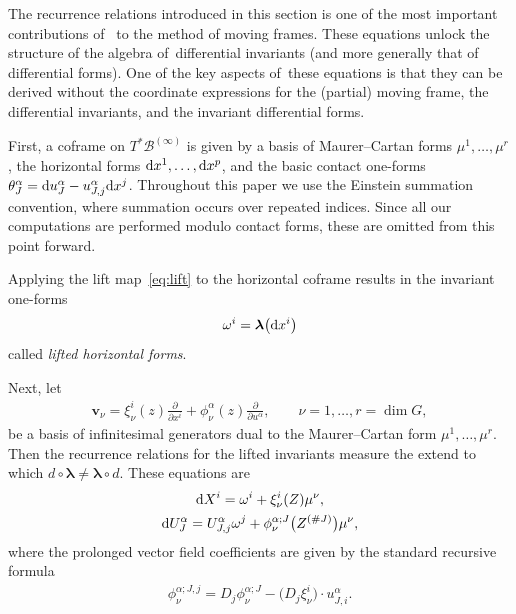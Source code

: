 \documentclass[pdftex]{sigma}%
\numberwithin{equation}{section}
\newcommand{\B}{\mathcal{B}}
\newcommand{\bl}{\boldsymbol{\lambda}}
\newcommand{\pp}[2]{\frac{\partial #1}{\partial #2}}
\newcommand{\vv}{\mathbf{v}}
\begin{document}
The recurrence relations introduced in this section is one of the most important contributions of~\cite{FO-1999} to the method of moving frames. These equations unlock the structure of the algebra of~differential invariants (and more generally that of differential forms). One of the key aspects of~these equations is that they can be derived without the coordinate expressions for the (partial) moving frame, the differential invariants, and the invariant differential forms.

First, a coframe on $T^*\B^{(\infty)}$ is given by a basis of Maurer--Cartan forms $\mu^1,\dots,\mu^r$, the horizontal forms ${\rm d}x^1,\dots,{\rm d}x^p$, and the basic contact one-forms $\theta^\alpha_J = {\rm d}u^\alpha_J - u^\alpha_{J,j}{\rm d}x^j$. Throughout this paper we use the Einstein summation convention, where summation
occurs over repeated indices. Since all our computations are performed modulo contact forms, these are omitted from this point forward.

Applying the lift map~\eqref{eq:lift} to the horizontal coframe results in the invariant one-forms
\begin{gather*}
\omega^i = \bl\big({\rm d}x^i\big)
\end{gather*}
called \emph{lifted horizontal forms}.

Next, let
\begin{gather*}
\vv_\nu = \xi^i_\nu(z) \pp{}{x^i} + \phi^\alpha_\nu(z) \pp{}{u^\alpha},\qquad
\nu=1,\dots,r=\dim G,
\end{gather*}
be a basis of infinitesimal generators dual to the Maurer--Cartan form $\mu^1,\dots,\mu^r$. Then the recurrence relations for the lifted invariants measure the extend to which $d\circ \bl \neq \bl \circ d$. These equations are
%
\begin{gather}
{\rm d}X^i = \omega^i + \xi^i_\nu(Z) \mu^\nu,\nonumber
\\
{\rm d}U^\alpha_{J} = U_{J,j}^\alpha \omega^j + \phi^{\alpha;J}_\nu\big(Z^{(\#J)}\big) \mu^\nu,
\label{eq:lifted recurrence relations}
\end{gather}
%
where the prolonged vector field coefficients are given by the standard recursive formula
\begin{gather*}
\phi^{\alpha;J,j}_\nu = D_j \phi^{\alpha;J}_\nu - \big(D_j\xi^i_\nu\big)\cdot u^\alpha_{J,i}.
\end{gather*}
\end{document}

